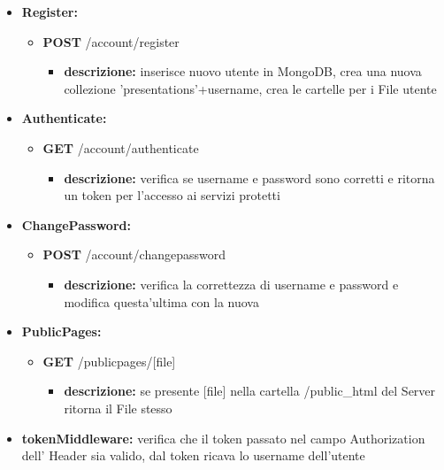 {\begin{itemize}
		\item \textbf{Register:}
			\begin{itemize}
			\item  \textbf{POST} /account/register 
				\begin{itemize} 
				\item \textbf{descrizione:} inserisce nuovo utente in MongoDB, crea una nuova collezione 'presentations'+username, crea le cartelle per i File utente
				\end{itemize}
			\end{itemize}
			
		\item \textbf{Authenticate:}
			\begin{itemize}
			\item  \textbf{GET} /account/authenticate 
				\begin{itemize} 
				\item \textbf{descrizione:} verifica se username e password sono corretti e ritorna un token per l'accesso ai servizi protetti
				\end{itemize}
			\end{itemize}
				
		\item \textbf{ChangePassword:}
			\begin{itemize}
			\item  \textbf{POST} /account/changepassword 
				\begin{itemize} 
				\item \textbf{descrizione:} verifica la correttezza di username e password e modifica questa'ultima con la nuova 
				\end{itemize}
			\end{itemize}
			
		\item \textbf{PublicPages:}
			\begin{itemize}
			\item  \textbf{GET} /publicpages/[file] 
				\begin{itemize} 
				\item \textbf{descrizione:} se presente [file] nella cartella /public\_html del Server\ped{g} ritorna il File stesso 
				\end{itemize}
			\end{itemize}
			
		\item \textbf{tokenMiddleware:} verifica che il token passato nel campo Authorization dell' Header sia valido, dal token ricava lo username dell'utente
		

\end{itemize}}
